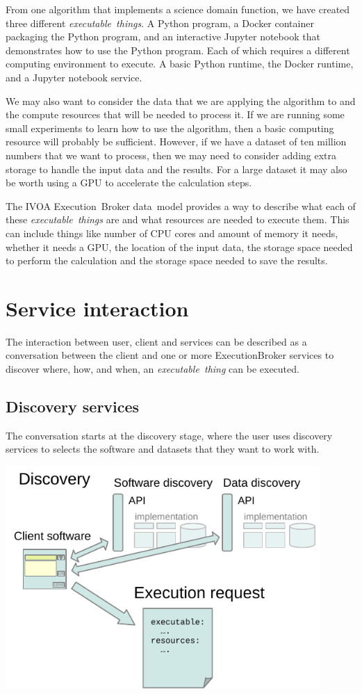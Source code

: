 \documentclass[11pt,a4paper]{ivoa}
\newcommand{\datamodel} {data~model}
\newcommand{\ivoa} {IVOA}
\newcommand{\execbrokerclass} {ExecutionBroker}
\newcommand{\executionbroker} {Execution~Broker}
\newcommand{\jupyternotebook} {Jupyter notebook}
\newcommand{\python} {Python}
\newcommand{\pythonprogram} {Python program}
\newcommand{\dockerruntime} {Docker runtime}
\newcommand{\dockercontainer} {Docker container}
\newcommand{\dataset}[1] {dataset#1}
\newcommand{\executablething}[1] {\textit{executable~thing#1}}
\newcommand{\cpu}[1] {CPU#1}
\newcommand{\gpu}[1] {GPU#1}
\begin{document}
From one algorithm that implements a science domain function, we have created three different \executablething{s}.
A \pythonprogram{}, a \dockercontainer{} packaging the \pythonprogram{}, and an interactive \jupyternotebook{}
that demonstrates how to use the \pythonprogram{}.
Each of which requires a different computing environment to execute.
A basic \python{} runtime, the \dockerruntime{}, and a \jupyternotebook{} service.

We may also want to consider the data that we are applying the algorithm to and the compute resources that
will be needed to process it.
If we are running some small experiments to learn how to use the algorithm, then a basic computing
resource will probably be sufficient.
However, if we have a \dataset{} of ten million numbers that we want to process, then we may
need to consider adding extra storage to handle the input data and the results.
For a large \dataset{} it may also be worth using a \gpu{} to accelerate the calculation steps.

The \ivoa{} \executionbroker{} \datamodel{} provides a way to describe what each of these \executablething{s}
are and what resources are needed to execute them.
This can include things like number of \cpu{} cores and amount of memory it needs,
whether it needs a \gpu{}, the location of the input data, the storage space needed to perform
the calculation and the storage space needed to save the results.

\section{Service interaction}
\label{service-interaction}

The interaction between user, client and services can be described as a conversation between the client
and one or more \execbrokerclass{} services to discover where, how, and when, an \executablething{} can be
executed.

\subsection{Discovery services}
\label{discovery-services}

The conversation starts at the discovery stage, where the user uses discovery services to
selects the software and \dataset{s} that they want to work with.

\includegraphics[width=0.9\textwidth]{diagrams/data-discovery.pdf}
\end{document}
